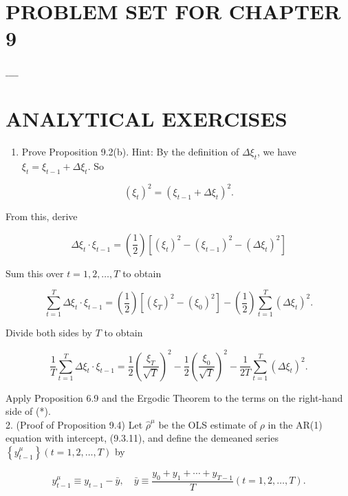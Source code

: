 \documentclass[10pt]{article}
\begin{document}
\section*{PROBLEM SET FOR CHAPTER 9}
$\_\_\_\_$

\section*{ANALYTICAL EXERCISES}
\begin{enumerate}
  \item Prove Proposition 9.2(b). Hint: By the definition of $\Delta \xi_{t}$, we have $\xi_{t}=\xi_{t-1}+ \Delta \xi_{t}$. So
\end{enumerate}

$$
\left(\xi_{t}\right)^{2}=\left(\xi_{t-1}+\Delta \xi_{t}\right)^{2} .
$$

From this, derive

$$
\Delta \xi_{t} \cdot \xi_{t-1}=\left(\frac{1}{2}\right)\left[\left(\xi_{t}\right)^{2}-\left(\xi_{t-1}\right)^{2}-\left(\Delta \xi_{t}\right)^{2}\right]
$$

Sum this over $t=1,2, \ldots, T$ to obtain

$$
\sum_{t=1}^{T} \Delta \xi_{t} \cdot \xi_{t-1}=\left(\frac{1}{2}\right)\left[\left(\xi_{T}\right)^{2}-\left(\xi_{0}\right)^{2}\right]-\left(\frac{1}{2}\right) \sum_{t=1}^{T}\left(\Delta \xi_{t}\right)^{2} .
$$

Divide both sides by $T$ to obtain


\begin{equation*}
\frac{1}{T} \sum_{t=1}^{T} \Delta \xi_{t} \cdot \xi_{t-1}=\frac{1}{2}\left(\frac{\xi_{T}}{\sqrt{T}}\right)^{2}-\frac{1}{2}\left(\frac{\xi_{0}}{\sqrt{T}}\right)^{2}-\frac{1}{2 T} \sum_{t=1}^{T}\left(\Delta \xi_{t}\right)^{2} . \tag{*}
\end{equation*}


Apply Proposition 6.9 and the Ergodic Theorem to the terms on the right-hand side of (*).\\
2. (Proof of Proposition 9.4) Let $\hat{\rho}^{\mu}$ be the OLS estimate of $\rho$ in the AR(1) equation with intercept, (9.3.11), and define the demeaned series $\left\{y_{t-1}^{\mu}\right\}(t= 1,2, \ldots, T)$ by


\begin{equation*}
y_{t-1}^{\mu} \equiv y_{t-1}-\bar{y}, \quad \bar{y} \equiv \frac{y_{0}+y_{1}+\cdots+y_{T-1}}{T}(t=1,2, \ldots, T) . \tag{1}
\end{equation*}
\end{document}
